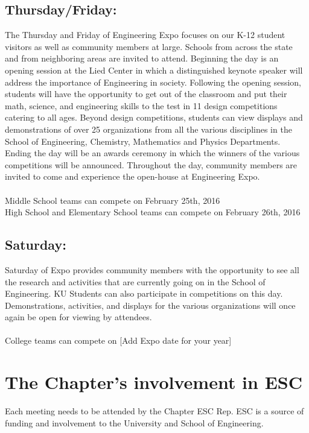 \subsection*{Thursday/Friday:}

The Thursday and Friday of Engineering Expo focuses on our K-12 student visitors as well as community members at large. Schools from across the state and from neighboring areas are invited to attend. Beginning the day is an opening session at the Lied Center in which a distinguished keynote speaker will address the importance of Engineering in society. Following the opening session, students will have the opportunity to get out of the classroom and put their math, science, and engineering skills to the test in 11 design competitions catering to all ages. Beyond design competitions, students can view displays and demonstrations of over 25 organizations from all the various disciplines in the School of Engineering, Chemistry, Mathematics and Physics Departments.  Ending the day will be an awards ceremony in which the winners of the various competitions will be announced. Throughout the day, community members are invited to come and experience the open-house at Engineering Expo.
\\
\\
Middle School teams can compete on February 25th, 2016
\\
High School and Elementary School teams can compete on February 26th, 2016

\subsection*{Saturday:}

Saturday of Expo provides community members with the opportunity to see all the research and activities that are currently going on in the School of Engineering. KU Students can also participate in competitions on this day. Demonstrations, activities, and displays for the various organizations will once again be open for viewing by attendees.
\\
\\
College teams can compete on [Add Expo date for your year]

\section{The Chapter's involvement in ESC}

Each meeting needs to be attended by the Chapter ESC Rep. ESC is a source of funding and involvement to the University and School of Engineering.

